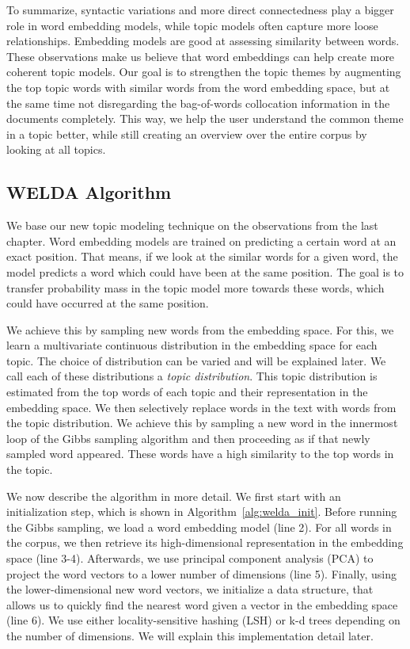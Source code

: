 \documentclass[
        a4paper,
        titlepage,
        twoside,
        parskip,
        numbers=noenddot
        ]{scrbook}
\theoremstyle{break}
\begin{document}
To summarize, syntactic variations and more direct connectedness play a bigger role in word embedding models, while topic models often capture more loose relationships.
Embedding models are good at assessing similarity between words.
These observations make us believe that word embeddings can help create more coherent topic models.
Our goal is to strengthen the topic themes by augmenting the top topic words with similar words from the word embedding space, but at the same time not disregarding the bag-of-words collocation information in the documents completely.
This way, we help the user understand the common theme in a topic better, while still creating an overview over the entire corpus by looking at all topics.

\subsection{WELDA Algorithm}

We base our new topic modeling technique on the observations from the last chapter.
Word embedding models are trained on predicting a certain word at an exact position.
That means, if we look at the similar words for a given word, the model predicts a word which could have been at the same position.
The goal is to transfer probability mass in the topic model more towards these words, which could have occurred at the same position.

We achieve this by sampling new words from the embedding space.
For this, we learn a multivariate continuous distribution in the embedding space for each topic.
The choice of distribution can be varied and will be explained later.
We call each of these distributions a \emph{topic distribution}.
This topic distribution is estimated from the top words of each topic and their representation in the embedding space.
We then selectively replace words in the text with words from the topic distribution.
We achieve this by sampling a new word in the innermost loop of the Gibbs sampling algorithm and then proceeding as if that newly sampled word appeared.
These words have a high similarity to the top words in the topic.

We now describe the algorithm in more detail.
We first start with an initialization step, which is shown in Algorithm~\ref{alg:welda_init}.
Before running the Gibbs sampling, we load a word embedding model (line 2).
For all words in the corpus, we then retrieve its high-dimensional representation in the embedding space (line 3-4).
Afterwards, we use principal component analysis (PCA) to project the word vectors to a lower number of dimensions (line 5).
Finally, using the lower-dimensional new word vectors, we initialize a data structure, that allows us to quickly find the nearest word given a vector in the embedding space (line 6).
We use either locality-sensitive hashing (LSH) or k-d trees depending on the number of dimensions.
We will explain this implementation detail later.
\end{document}
